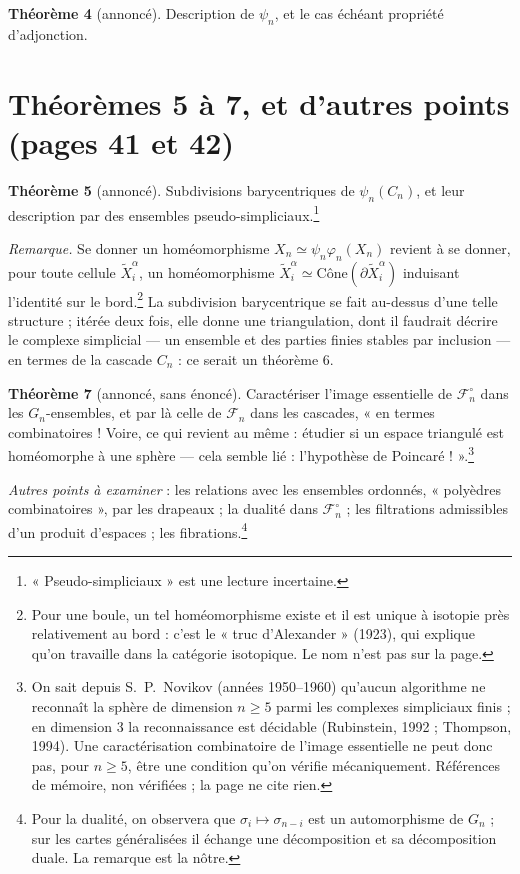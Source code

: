 \documentclass[11pt,a4paper]{article}
\begin{document}
\textbf{Théorème 4} (annoncé). Description de $\psi_n$, et le cas échéant
propriété d'adjonction.

\section*{Théorèmes 5 à 7, et d'autres points (pages 41 et 42)}

\textbf{Théorème 5} (annoncé). Subdivisions barycentriques de
$\psi_n(C_n)$, et leur description par des ensembles
pseudo-simpliciaux.\footnote{« Pseudo-simpliciaux » est une lecture
incertaine.}

\emph{Remarque.} Se donner un homéomorphisme $X_n \simeq \psi_n\varphi_n(X_n)$
revient à se donner, pour toute cellule $\widetilde{X}_i^\alpha$, un
homéomorphisme $\widetilde{X}_i^\alpha \simeq
\mathrm{Cône}(\partial\widetilde{X}_i^\alpha)$ induisant l'identité sur le
bord.\footnote{Pour une boule, un tel homéomorphisme existe et il est unique à
isotopie près relativement au bord : c'est le « truc d'Alexander » (1923), qui
explique qu'on travaille dans la catégorie isotopique. Le nom n'est pas sur
la page.} La subdivision barycentrique se fait au-dessus d'une telle
structure ; itérée deux fois, elle donne une triangulation, dont il faudrait
décrire le complexe simplicial --- un ensemble et des parties finies stables
par inclusion --- en termes de la cascade $C_n$ : ce serait un théorème 6.

\textbf{Théorème 7} (annoncé, sans énoncé). Caractériser l'image essentielle
de $\mathcal{F}_n^\circ$ dans les $G_n$-ensembles, et par là celle de
$\mathcal{F}_n$ dans les cascades, « en termes combinatoires ! Voire, ce qui
revient au même : étudier si un espace triangulé est homéomorphe à une
sphère --- cela semble lié : l'hypothèse de Poincaré ! ».\footnote{On sait
depuis S.~P.~Novikov (années 1950--1960) qu'aucun algorithme ne reconnaît la
sphère de dimension $n \geqslant 5$ parmi les complexes simpliciaux finis ; en
dimension 3 la reconnaissance est décidable (Rubinstein, 1992 ; Thompson,
1994). Une caractérisation combinatoire de l'image essentielle ne peut donc
pas, pour $n \geqslant 5$, être une condition qu'on vérifie mécaniquement.
Références de mémoire, non vérifiées ; la page ne cite rien.}

\emph{Autres points à examiner} : les relations avec les ensembles ordonnés,
« polyèdres combinatoires », par les drapeaux ; la dualité dans
$\mathcal{F}_n^\circ$ ; les filtrations admissibles d'un produit d'espaces ;
les fibrations.\footnote{Pour la dualité, on observera que $\sigma_i \mapsto
\sigma_{n-i}$ est un automorphisme de $G_n$ ; sur les cartes généralisées il
échange une décomposition et sa décomposition duale. La remarque est la
nôtre.}
\end{document}
